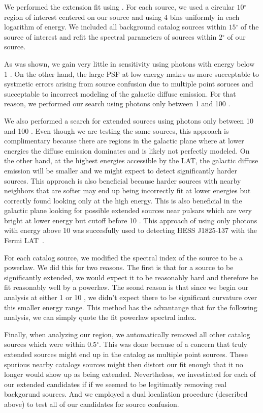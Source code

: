 \documentclass[12pt,preprint]{aastex}
\newcommand{\gev}{\text{GeV}\xspace}
\renewcommand{\deg}{\ensuremath{^\circ}\xspace}
\newcommand{\pointlike}{\text{\em pointlike}\xspace}
\begin{document}
We performed the extension fit using \pointlike.  For each source, we
used a circular $10\deg$ region of interest centered on our source and
using 4 bins uniformly in each logarithm of energy.  We included all
background catalog sources within $15\deg$ of the source of interest
and refit the spectral parameters of sources within $2\deg$ of our source.

As was shown, we gain very little in sensitivity using photons with energy
below 1 \gev. On the other hand, the large PSF at low energy makes us
more succeptable to systmetic errors arising from source confusion due
to multiple point soruces and succeptable to incorrect modeling of the
galactic diffuse emission.  For that reason, we performed our search
using photons only between 1 \gev and 100 \gev.

We also performed a search for extended sources using photons only between
10 \gev and 100 \gev. Even though we are testing the same sources, this
approach is complimentary because there are regions in the galactic
plane where at lower energies the diffuse emission dominates and is
likely not perfectly modeled. On the other hand, at the highest energies
accessible by the LAT, the galactic diffuse emission will be smaller and
we might expect to detect significantly harder sources. This approach is
also beneficial because harder sources with nearby neighbors that are
softer may end up being incorrectly fit at lower energies but correctly
found looking only at the high energy.  This is also beneficial in the
galactic plane looking for possible extended sources near pulsars which
are very bright at lower energy but cutoff before 10 \gev.  This approach
of using only photons with energy above 10 \gev was succesfully used to detecting
HESS J1825-137 with the Fermi LAT~\cite{fermi_hess_j1825}.

For each catalog source, we modified the spectral index of the source
to be a powerlaw. We did this for two reasons. The first is that for a
source to be significantly extended, we would expect it to be reasonably
hard and therefore be fit reasonably well by a powerlaw.  The seond reason
is that since we begin our analysis at either 1 \gev or 10 \gev, we didn't
expect there to be significant curvature over this smaller energy range.
This method has the advantange that for the following analysis, we can
simply quote the fit powerlaw spectral index.

Finally, when analyzing our region, we automatically removed all other
catalog sources which were within 0.5\deg. This was done because of
a concern that truly extended sources might end up in the catalog as
multiple point sources. These spurious nearby catalogs sources might then
distort our fit enough that it no longer would show up as being extended.
Nevertheless, we investiated for each of our extended candidates if
if we seemed to be legitimatly removing real backgorund sources. And
we employed a dual localiation procedure (described above) to test
all of our candidates for source confusion.
\end{document}
